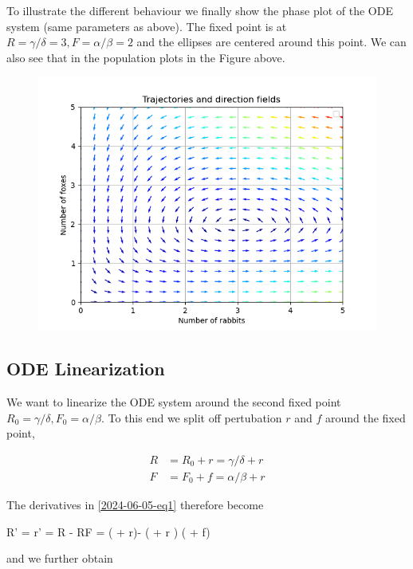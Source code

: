 To illustrate the different behaviour we finally show the phase plot of the ODE system (same parameters as above). The fixed point is at $R = \gamma / \delta = 3, F = \alpha / \beta = 2$ and the ellipses are centered around this point. We can also see that in the population plots in the Figure above.

\begin{figure}[H]
    \centering
    \includegraphics[scale=0.75]{images/2024-06-05-pred_prey_11.png}
\end{figure}

\subsection{ODE Linearization}

We want to linearize the ODE system around the second fixed point $R_0 = \gamma / \delta, F_0 = \alpha / \beta$. To this end we split off pertubation $r$ and $f$ around the fixed point,

\begin{align*}
    R &= R_0 + r = \gamma / \delta + r \\
    F &= F_0 + f = \alpha / \beta + r
\end{align*}

The derivatives in \eqref{2024-06-05-eq1} therefore become

\bee
R' = r' = \alpha R - \beta RF = \alpha \left(\frac{\gamma}{\delta} + r\right)- \beta \left(\frac{\gamma}{\delta} + r \right) \left( \frac{\alpha}{\beta} + f\right)
\eee

and we further obtain

